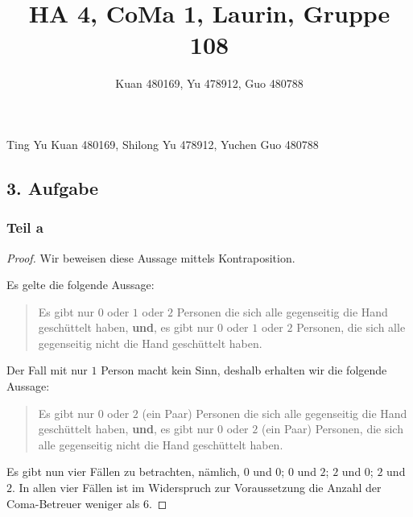 \documentclass[a5paper]{article}
\title{HA 4, CoMa 1, Laurin, Gruppe 108}
\author{Kuan 480169, Yu 478912, Guo 480788}
\theoremstyle{remark}
\begin{document}
\maketitle
\begin{center}
Ting Yu Kuan 480169, Shilong Yu 478912, Yuchen Guo 480788
\end{center}
\subsection{3. Aufgabe}
\subsubsection{Teil a}
\begin{proof}
  Wir beweisen diese Aussage mittels Kontraposition.

  Es gelte die folgende Aussage:
  \begin{quote}
    Es gibt nur \(0\) oder \(1\) oder \(2\) Personen die sich alle
    gegenseitig die Hand geschüttelt haben, \textbf{und},
    es gibt nur \(0\) oder \(1\) oder \(2\) Personen, die sich alle
    gegenseitig nicht die Hand geschüttelt haben.
  \end{quote}

  Der Fall mit nur \(1\) Person macht kein Sinn, deshalb erhalten wir
  die folgende Aussage:
  \begin{quote}
    Es gibt nur \(0\) oder \(2\) (ein Paar) Personen die sich alle
    gegenseitig die Hand geschüttelt haben, \textbf{und}, es gibt nur
    \(0\) oder \(2\) (ein Paar) Personen, die sich alle gegenseitig nicht
    die Hand geschüttelt haben.
  \end{quote}

  Es gibt nun vier Fällen zu betrachten, nämlich, \(0\) und \(0\); \(0\) und
  \(2\); \(2\) und \(0\); \(2\) und \(2\).  In allen vier Fällen ist im
  Widerspruch zur Voraussetzung die Anzahl der Coma-Betreuer weniger
  als \(6\).
\end{proof}
\end{document}
